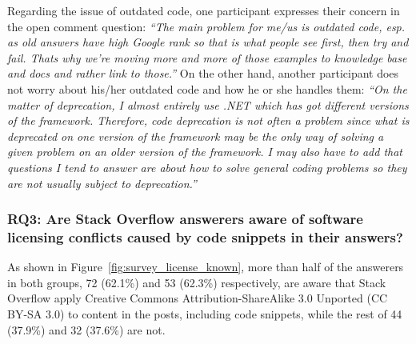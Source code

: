 \documentclass{svjour3}                     %
\begin{document}
Regarding the issue of outdated code, one participant expresses their concern
in the open comment question: \textit{``The main problem for me/us is outdated
	code, esp. as old answers have high Google rank so that is what people see
	first, then try and fail. Thats why we're moving more and more of those examples
	to knowledge base and docs and rather link to those.''} On the other hand,
another participant does not  worry about his/her outdated code and how he
or she handles them: \textit{``On
	the matter of deprecation, I almost entirely use .NET which has got different
	versions of the framework. Therefore, code deprecation is not often a problem
	since what is deprecated on one version of the framework may be the only way of
	solving a given problem on an older version of the framework. I may also have to
	add that questions I tend to answer are about how to solve general coding
	problems so they are not usually subject to deprecation.''}

\vspace{0.5cm} \noindent{}
\vspace{0.5cm}

\subsubsection*{RQ3: Are Stack Overflow answerers aware of software licensing
	conflicts caused by code snippets in their answers?}

As shown in Figure~\ref{fig:survey_license_known}, more than half of the
answerers in both groups, 72 (62.1\%) and 53 (62.3\%) respectively, are aware that Stack
Overflow apply Creative Commons Attribution-ShareAlike 3.0 Unported (CC BY-SA
3.0) to content in the posts, including code snippets, while the rest of 44 (37.9\%)
and 32 (37.6\%) are not. 
\end{document}
